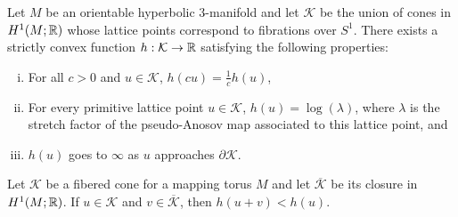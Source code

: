 
\begin{thm}
  \label{thm:fm}
  Let $M$ be an orientable hyperbolic $3$-manifold and let $\mathcal{K}$ be the union of cones in $H^1(M; \mathbb{R})$ whose lattice points correspond to fibrations over $S^1$.
  There exists a strictly convex function $h: \mathcal{K} \to \mathbb{R}$ satisfying the following properties:
  \begin{enumerate}[(i)]
  \item For all $c > 0$ and $u \in \mathcal{K}$, $h(cu) =  \frac{1}{c}h(u)$,
  \item For every primitive lattice point $u \in \mathcal{K}$, $h(u) = \log(\lambda)$, where $\lambda$ is the
    stretch factor of the pseudo-Anosov map associated to this lattice point, and
  \item $h(u)$ goes to $\infty$ as $u$ approaches $\partial \mathcal{K}$.
  \end{enumerate}
\end{thm}

\begin{thm}
  \label{thm:alm}
  Let $\mathcal{K}$ be a fibered cone for a mapping torus $M$ and let $\overline{\mathcal{K}}$ be its closure
  in $H^1(M;\mathbb{R})$. If $u \in \mathcal{K}$ and $v \in \overline{\mathcal{K}}$, then $h(u+v) < h(u)$.
\end{thm}

